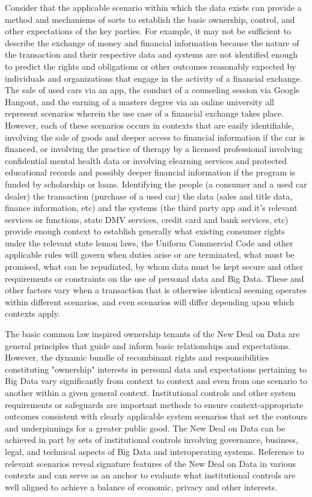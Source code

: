 Consider that the applicable scenario within which the data exists can provide a method and mechanisms of sorts to establish the basic ownership, control, and other expectations of the key parties.
For example, it may not be sufficient to describe the exchange of money and financial information because the nature of the transaction and their respective data and systems are not identified enough to predict the rights and obligations or other outcomes reasonably expected by individuals and organizations that engage in the activity of a financial exchange.
The sale of used cars via an app, the conduct of a counseling session via Google Hangout, and the earning of a masters degree via an online university all represent scenarios wherein the use case of a financial exchange takes place.
However, each of these scenarios occurs in contexts that are easily identifiable, involving the sale of goods and deeper access to financial information if the car is financed, or involving the practice of therapy by a licensed professional involving confidential mental health data or involving elearning services and protected educational records and possibly deeper financial information if the program is funded by scholarship or loans.
Identifying the people (a consumer and a used car dealer) the transaction (purchase of a used car) the data (sales and title data, finance information, etc) and the systems (the third party app and it's relevant services or functions, state DMV services, credit card and bank services, etc) provide enough context to establish generally what existing consumer rights under the relevant state lemon laws, the Uniform Commercial Code and other applicable rules will govern when duties arise or are terminated, what must be promised, what can be repudiated, by whom data must be kept secure and other requirements or constraints on the use of personal data and Big Data.
These and other factors vary when a transaction that is otherwise identical seeming operates within different scenarios, and even scenarios will differ depending upon which contexts apply.  

The basic common law inspired ownership tenants of the New Deal on Data are general principles that guide and inform basic relationships and expectations.
However, the dynamic bundle of recombinant rights and responsibilities constituting "ownership" interests in personal data and expectations pertaining to Big Data vary significantly from context to context and even from one scenario to another within a given general context.  
Institutional controls and other system requirements or safeguards are important methods to ensure context-appropriate outcomes consistent with clearly applicable system scenarios that set the contours and underpinnings for a greater public good.
The New Deal on Data can be achieved in part by sets of institutional controls involving governance, business, legal, and technical aspects of Big Data and interoperating systems.
Reference to relevant scenarios reveal signature features of the New Deal on Data in various contexts and can serve as an anchor to evaluate what institutional controls are well aligned to achieve a balance of economic, privacy and other interests. 

